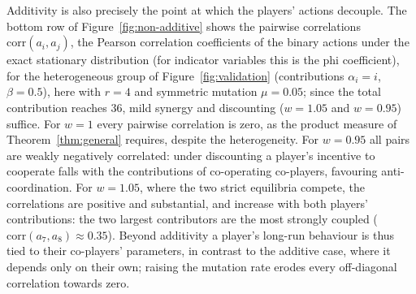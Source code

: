 \documentclass[11pt]{article}
\begin{document}
Additivity is also precisely the point at which the players' actions
decouple. The bottom row of Figure~\ref{fig:non-additive} shows the pairwise
correlations \(\mathrm{corr}(a_i,a_j)\), the Pearson correlation
coefficients of the binary actions under the exact stationary distribution
(for indicator variables this is the phi coefficient),
for the heterogeneous group of Figure~\ref{fig:validation} (contributions
\(\alpha_i=i\), \(\beta=0.5\)), here with \(r=4\) and symmetric mutation
\(\mu=0.05\); since the total contribution reaches \(36\), mild synergy and
discounting (\(w=1.05\) and \(w=0.95\)) suffice. For \(w=1\) every pairwise
correlation is zero, as the product measure of Theorem~\ref{thm:general}
requires, despite the heterogeneity. For \(w=0.95\) all pairs are weakly
negatively correlated: under discounting a player's incentive to cooperate
falls with the contributions of co-operating co-players, favouring
anti-coordination. For \(w=1.05\), where the two strict equilibria compete,
the correlations are positive and substantial, and increase with both
players' contributions: the two largest contributors are the most strongly
coupled (\(\mathrm{corr}(a_7,a_8)\approx0.35\)). Beyond additivity a
player's long-run behaviour is thus tied to their co-players' parameters, in
contrast to the additive case, where it depends only on their own; raising
the mutation rate erodes every off-diagonal correlation towards zero.
\end{document}
